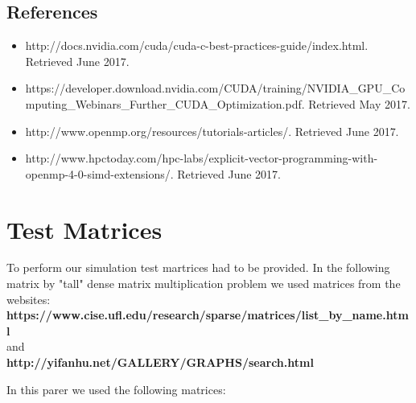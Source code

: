 \documentclass{scrreprt}
\begin{document}
\section{References}

\begin{itemize}
\item http://docs.nvidia.com/cuda/cuda-c-best-practices-guide/index.html. Retrieved June 2017.
\item https://developer.download.nvidia.com/CUDA/training/NVIDIA_GPU_Computing_Webinars_Further_CUDA_Optimization.pdf. Retrieved May 2017.
\item http://www.openmp.org/resources/tutorials-articles/. Retrieved June 2017.
\item http://www.hpctoday.com/hpc-labs/explicit-vector-programming-with-openmp-4-0-simd-extensions/. Retrieved June 2017.
\end{itemize}



\chapter{Test Matrices}

To perform our simulation test martrices had to be provided. In the following matrix by "tall" dense matrix multiplication problem we used matrices from the websites: \\
\textbf{https://www.cise.ufl.edu/research/sparse/matrices/list_by_name.html} \\
and \\
\textbf{http://yifanhu.net/GALLERY/GRAPHS/search.html}

In this parer we used the following matrices:




\setlength{\arrayrulewidth}{1mm}
\setlength{\tabcolsep}{13pt}
\renewcommand{\arraystretch}{2.5}
 
 
 
\end{document}
